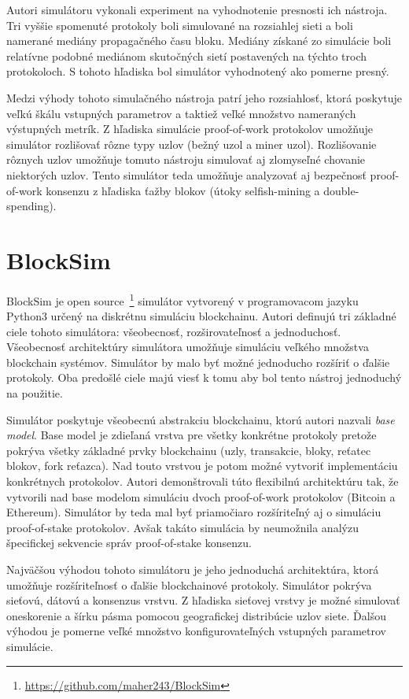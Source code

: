 Autori simulátoru vykonali experiment na vyhodnotenie presnosti ich nástroja. Tri vyššie spomenuté protokoly boli simulované na rozsiahlej sieti a boli namerané mediány propagačného času bloku. Mediány získané zo simulácie boli relatívne podobné mediánom skutočných sietí postavených na týchto troch protokoloch. S tohoto hľadiska bol simulátor vyhodnotený ako pomerne presný.~\cite{btcSimulatorWp}

Medzi výhody tohoto simulačného nástroja patrí jeho rozsiahlosť, ktorá poskytuje veľkú škálu vstupných parametrov a taktiež veľké množstvo nameraných výstupných metrík. Z hľadiska simulácie proof-of-work protokolov umožňuje simulátor rozlišovať rôzne typy uzlov (bežný uzol a miner uzol). Rozlišovanie rôznych uzlov umožňuje tomuto nástroju simulovať aj zlomyseľné chovanie niektorých uzlov. Tento simulátor teda umožňuje analyzovať aj bezpečnosť proof-of-work konsenzu z hľadiska ťažby blokov (útoky selfish-mining a double-spending).~\cite{fanPerfEval}

\section{BlockSim}\label{sec:blocksim}

BlockSim je open source~\footnote{\url{https://github.com/maher243/BlockSim}} simulátor vytvorený v programovacom jazyku Python3 určený na diskrétnu simuláciu blockchainu. Autori definujú tri základné ciele tohoto simulátora: všeobecnosť, rozširovateľnosť a jednoduchosť. Všeobecnosť architektúry simulátora umožňuje simuláciu veľkého množstva blockchain systémov. Simulátor by malo byť možné jednoducho rozšíriť o ďalšie protokoly. Oba predošlé ciele majú viesť k tomu aby bol tento nástroj jednoduchý na použitie. 

Simulátor poskytuje všeobecnú abstrakciu blockchainu, ktorú autori nazvali \textit{base model}. Base model je zdieľaná vrstva pre všetky konkrétne protokoly pretože pokrýva všetky základné prvky blockchainu (uzly, transakcie, bloky, reťatec blokov, fork reťazca). Nad touto vrstvou je potom možné vytvoriť implementáciu konkrétnych protokolov. Autori demonštrovali túto flexibilnú architektúru tak, že vytvorili nad base modelom simuláciu dvoch proof-of-work protokolov (Bitcoin a Ethereum). Simulátor by teda mal byť priamočiaro rozšíriteľný aj o simuláciu proof-of-stake protokolov. Avšak takáto simulácia by neumožnila analýzu špecifickej sekvencie správ proof-of-stake konsenzu.~\cite{blocksimWp}	

Najväčšou výhodou tohoto simulátoru je jeho jednoduchá architektúra, ktorá umožňuje rozšíriteľnosť o ďalšie blockchainové protokoly. Simulátor pokrýva sieťovú, dátovú a konsenzus vrstvu. Z hľadiska sieťovej vrstvy je možné simulovať oneskorenie a šírku pásma pomocou geografickej distribúcie uzlov siete. Ďalšou výhodou je pomerne veľké množstvo konfigurovateľných vstupných parametrov simulácie. 

